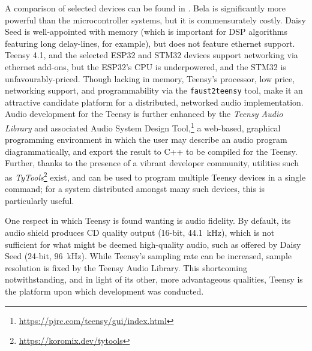 A comparison of selected devices can be found in
.
Bela is significantly more powerful than the microcontroller systems, but it is
commensurately costly.
Daisy Seed is well-appointed with memory (which is important for DSP algorithms
featuring long delay-lines, for example), but does not feature ethernet support.
Teensy 4.1, and the selected ESP32 and STM32 devices support networking via
ethernet add-ons, but the ESP32's CPU is underpowered, and the STM32 is
unfavourably-priced.
Though lacking in memory, Teensy's processor, low price, networking support, and
programmability via the \texttt{faust2teensy} tool, make it an attractive
candidate platform for a distributed, networked audio implementation.
Audio development for the Teensy is further enhanced by the \textit{Teensy
Audio Library} and associated Audio System Design Tool,\footnote{
    \url{https://pjrc.com/teensy/gui/index.html}
} a web-based, graphical programming environment in which the user may describe
an audio program diagrammatically, and export the result to C++ to be compiled
for the Teensy.
Further, thanks to the presence of a vibrant developer community, utilities such
as \textit{TyTools}\footnote{\url{https://koromix.dev/tytools}} exist, and can
be used to program multiple Teensy devices in a single command;
for a system distributed amongst many such devices, this is particularly useful.

One respect in which Teensy is found wanting is audio fidelity.
By default, its audio shield produces CD quality output (16-bit,
\qty{44.1}{\kHz}), which is not sufficient for what might be deemed high-quality
audio, such as offered by Daisy Seed (24-bit, \qty{96}{\kHz}).
While Teensy's sampling rate can be increased, sample resolution is fixed by
the Teensy Audio Library.
This shortcoming notwithstanding, and in light of its other, more advantageous
qualities, Teensy is the platform upon which development was conducted.
